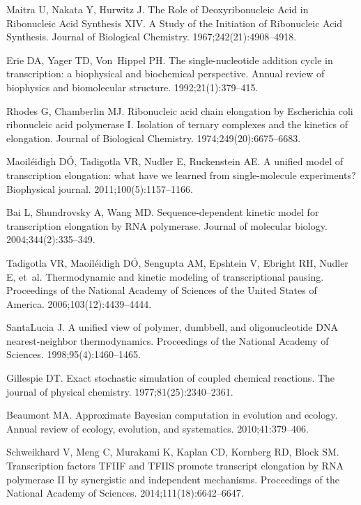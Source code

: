 \documentclass[10pt,letterpaper]{article}
\begin{document}
{{\begin{thebibliography}{10}
Maitra U, Nakata Y, Hurwitz J.
\newblock The Role of Deoxyribonucleic Acid in Ribonucleic Acid Synthesis XIV.
  A Study of the Initiation of Ribonucleic Acid Synthesis.
\newblock Journal of Biological Chemistry. 1967;242(21):4908--4918.

Erie DA, Yager TD, Von~Hippel PH.
\newblock The single-nucleotide addition cycle in transcription: a biophysical
  and biochemical perspective.
\newblock Annual review of biophysics and biomolecular structure.
  1992;21(1):379--415.

Rhodes G, Chamberlin MJ.
\newblock Ribonucleic acid chain elongation by Escherichia coli ribonucleic
  acid polymerase I. Isolation of ternary complexes and the kinetics of
  elongation.
\newblock Journal of Biological Chemistry. 1974;249(20):6675--6683.

Maoil{\'e}idigh D{\'O}, Tadigotla VR, Nudler E, Ruckenstein AE.
\newblock A unified model of transcription elongation: what have we learned
  from single-molecule experiments?
\newblock Biophysical journal. 2011;100(5):1157--1166.

Bai L, Shundrovsky A, Wang MD.
\newblock Sequence-dependent kinetic model for transcription elongation by RNA
  polymerase.
\newblock Journal of molecular biology. 2004;344(2):335--349.

Tadigotla VR, Maoil{\'e}idigh D{\'O}, Sengupta AM, Epshtein V, Ebright RH,
  Nudler E, et~al.
\newblock Thermodynamic and kinetic modeling of transcriptional pausing.
\newblock Proceedings of the National Academy of Sciences of the United States
  of America. 2006;103(12):4439--4444.

SantaLucia J.
\newblock A unified view of polymer, dumbbell, and oligonucleotide DNA
  nearest-neighbor thermodynamics.
\newblock Proceedings of the National Academy of Sciences.
  1998;95(4):1460--1465.

Gillespie DT.
\newblock Exact stochastic simulation of coupled chemical reactions.
\newblock The journal of physical chemistry. 1977;81(25):2340--2361.

Beaumont MA.
\newblock Approximate Bayesian computation in evolution and ecology.
\newblock Annual review of ecology, evolution, and systematics.
  2010;41:379--406.

Schweikhard V, Meng C, Murakami K, Kaplan CD, Kornberg RD, Block SM.
\newblock Transcription factors TFIIF and TFIIS promote transcript elongation
  by RNA polymerase II by synergistic and independent mechanisms.
\newblock Proceedings of the National Academy of Sciences.
  2014;111(18):6642--6647.


\end{thebibliography}}}
\end{document}
